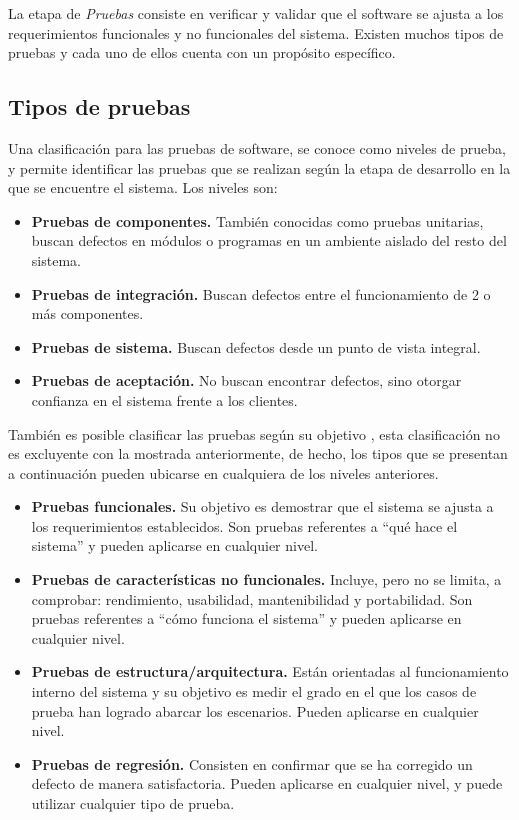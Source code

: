 La etapa de {\it Pruebas} consiste en verificar y validar que el software se ajusta a los requerimientos funcionales y no funcionales del sistema. Existen muchos tipos de pruebas y cada uno de ellos cuenta con un propósito específico.

\subsection{Tipos de pruebas}

	Una clasificación para las pruebas de software, se conoce como niveles de prueba, y permite identificar las pruebas que se realizan según la etapa de desarrollo en la que se encuentre el sistema. Los niveles son:
\begin{itemize}
	\item {\bf Pruebas de componentes.} También conocidas como pruebas unitarias, buscan defectos en módulos o programas en un ambiente aislado del resto del sistema.
	\item {\bf Pruebas de integración.} Buscan defectos entre el funcionamiento de 2 o más componentes.
	\item {\bf Pruebas de sistema.} Buscan defectos desde un punto de vista integral.
	\item {\bf Pruebas de aceptación.} No buscan encontrar defectos, sino otorgar confianza en el sistema frente a los clientes.
\end{itemize}

	También es posible clasificar las pruebas según su objetivo \cite{istqb2011}, esta clasificación no es excluyente con la mostrada anteriormente, de hecho, los tipos que se presentan a continuación pueden ubicarse en cualquiera de los niveles anteriores.

\begin{itemize}
	\item {\bf Pruebas funcionales.} Su objetivo es demostrar que el sistema se ajusta a los requerimientos establecidos. Son pruebas referentes a ``qué hace el sistema'' y pueden aplicarse en cualquier nivel.
	\item {\bf Pruebas de características no funcionales.} Incluye, pero no se limita, a comprobar: rendimiento, usabilidad, mantenibilidad y portabilidad. Son pruebas referentes a ``cómo funciona el sistema'' y pueden aplicarse en cualquier nivel.	
	\item {\bf Pruebas de estructura/arquitectura.} Están orientadas al funcionamiento interno del sistema y su objetivo es medir el grado en el que los casos de prueba han logrado abarcar los escenarios. Pueden aplicarse en cualquier nivel.
	\item {\bf Pruebas de regresión.} Consisten en confirmar que se ha corregido un defecto de manera satisfactoria. Pueden aplicarse en cualquier nivel, y puede utilizar cualquier tipo de prueba.
\end{itemize}


